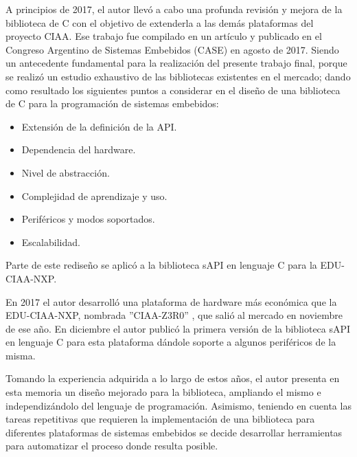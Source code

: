 A principios de 2017, el autor llevó a cabo una profunda revisión y mejora de la biblioteca de C con el objetivo de extenderla a las demás plataformas del proyecto CIAA.
Ese trabajo fue compilado en un artículo y publicado en el Congreso Argentino de Sistemas Embebidos (CASE) \citep{paperSapiCASE2017} en agosto de 2017. Siendo un antecedente fundamental para la realización del presente trabajo final, porque se realizó un estudio exhaustivo de las bibliotecas existentes en el mercado; dando como resultado los siguientes puntos a considerar en el diseño de una biblioteca de C para la programación de sistemas embebidos:

\begin{itemize}
\item
Extensión de la definición de la API.
\item
Dependencia del hardware.
\item
Nivel de abstracción.
\item
Complejidad de aprendizaje y uso.
\item
Periféricos y modos soportados.
\item
Escalabilidad.
\end{itemize}

Parte de este rediseño se aplicó a la biblioteca sAPI en lenguaje C para la EDU-CIAA-NXP.

En 2017 el autor desarrolló una plataforma de hardware más económica que la EDU-CIAA-NXP, nombrada ''CIAA-Z3R0'' \cite{CIAAZ3R0}, que salió al mercado en noviembre de ese año. En diciembre el autor publicó la primera versión de la biblioteca sAPI en lenguaje C para esta plataforma dándole soporte a algunos periféricos de la misma.

Tomando la experiencia adquirida a lo largo de estos años, el autor presenta en esta memoria un diseño mejorado para la biblioteca, ampliando el mismo e independizándolo del lenguaje de programación. Asimismo, teniendo en cuenta las tareas repetitivas que requieren la implementación de una biblioteca para diferentes plataformas de sistemas embebidos se decide desarrollar herramientas para automatizar el proceso donde resulta posible.

